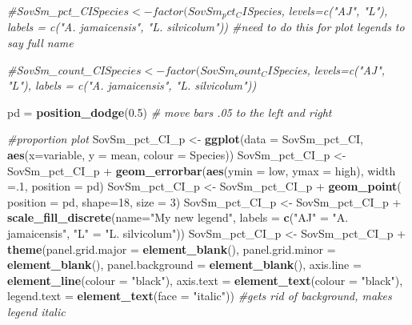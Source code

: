 \documentclass[]{article}
\newenvironment{Shaded}{\begin{snugshade}}{\end{snugshade}}
\newcommand{\KeywordTok}[1]{\textcolor[rgb]{0.13,0.29,0.53}{\textbf{{#1}}}}
\newcommand{\DataTypeTok}[1]{\textcolor[rgb]{0.13,0.29,0.53}{{#1}}}
\newcommand{\DecValTok}[1]{\textcolor[rgb]{0.00,0.00,0.81}{{#1}}}
\newcommand{\FloatTok}[1]{\textcolor[rgb]{0.00,0.00,0.81}{{#1}}}
\newcommand{\StringTok}[1]{\textcolor[rgb]{0.31,0.60,0.02}{{#1}}}
\newcommand{\CommentTok}[1]{\textcolor[rgb]{0.56,0.35,0.01}{\textit{{#1}}}}
\newcommand{\NormalTok}[1]{{#1}}
\begin{document}
\begin{Shaded}
\begin{Highlighting}[]
\CommentTok{#SovSm_pct_CI$Species <- factor(SovSm_pct_CI$Species, levels=c("AJ", "L"), labels = c("A. jamaicensis", "L. silvicolum")) #need to do this for plot legends to say full name}

\CommentTok{#SovSm_count_CI$Species <- factor(SovSm_count_CI$Species, levels=c("AJ", "L"), labels = c("A. jamaicensis", "L. silvicolum"))}


\NormalTok{pd =}\StringTok{ }\KeywordTok{position_dodge}\NormalTok{(}\FloatTok{0.5}\NormalTok{) }\CommentTok{# move bars .05 to the left and right}

\CommentTok{#proportion plot}
\NormalTok{SovSm_pct_CI_p <-}\StringTok{ }\KeywordTok{ggplot}\NormalTok{(}\DataTypeTok{data =} \NormalTok{SovSm_pct_CI, }\KeywordTok{aes}\NormalTok{(}\DataTypeTok{x=}\NormalTok{variable, }\DataTypeTok{y =} \NormalTok{mean, }\DataTypeTok{colour =} \NormalTok{Species))}
\NormalTok{SovSm_pct_CI_p <-}\StringTok{ }\NormalTok{SovSm_pct_CI_p +}\StringTok{ }\KeywordTok{geom_errorbar}\NormalTok{(}\KeywordTok{aes}\NormalTok{(}\DataTypeTok{ymin =} \NormalTok{low, }\DataTypeTok{ymax =} \NormalTok{high), }\DataTypeTok{width =}\NormalTok{.}\DecValTok{1}\NormalTok{, }\DataTypeTok{position =} \NormalTok{pd)}
\NormalTok{SovSm_pct_CI_p <-}\StringTok{ }\NormalTok{SovSm_pct_CI_p +}\StringTok{ }\KeywordTok{geom_point}\NormalTok{( }\DataTypeTok{position =} \NormalTok{pd, }\DataTypeTok{shape=}\DecValTok{18}\NormalTok{, }\DataTypeTok{size =} \DecValTok{3}\NormalTok{)}
\NormalTok{SovSm_pct_CI_p <-}\StringTok{ }\NormalTok{SovSm_pct_CI_p +}\StringTok{ }\KeywordTok{scale_fill_discrete}\NormalTok{(}\DataTypeTok{name=}\StringTok{"My new legend"}\NormalTok{, }\DataTypeTok{labels =} \KeywordTok{c}\NormalTok{(}\StringTok{"AJ"} \NormalTok{=}\StringTok{ "A. jamaicensis"}\NormalTok{, }\StringTok{"L"} \NormalTok{=}\StringTok{ "L. silvicolum"}\NormalTok{)) }
\NormalTok{SovSm_pct_CI_p <-}\StringTok{ }\NormalTok{SovSm_pct_CI_p +}\StringTok{ }\KeywordTok{theme}\NormalTok{(}\DataTypeTok{panel.grid.major =} \KeywordTok{element_blank}\NormalTok{(), }\DataTypeTok{panel.grid.minor =} \KeywordTok{element_blank}\NormalTok{(),}
\DataTypeTok{panel.background =} \KeywordTok{element_blank}\NormalTok{(), }\DataTypeTok{axis.line =} \KeywordTok{element_line}\NormalTok{(}\DataTypeTok{colour =} \StringTok{"black"}\NormalTok{), }\DataTypeTok{axis.text =} \KeywordTok{element_text}\NormalTok{(}\DataTypeTok{colour =} \StringTok{"black"}\NormalTok{), }\DataTypeTok{legend.text =} \KeywordTok{element_text}\NormalTok{(}\DataTypeTok{face =} \StringTok{"italic"}\NormalTok{))  }\CommentTok{#gets rid of background, makes legend italic}


\end{Highlighting}
\end{Shaded}
\end{document}
